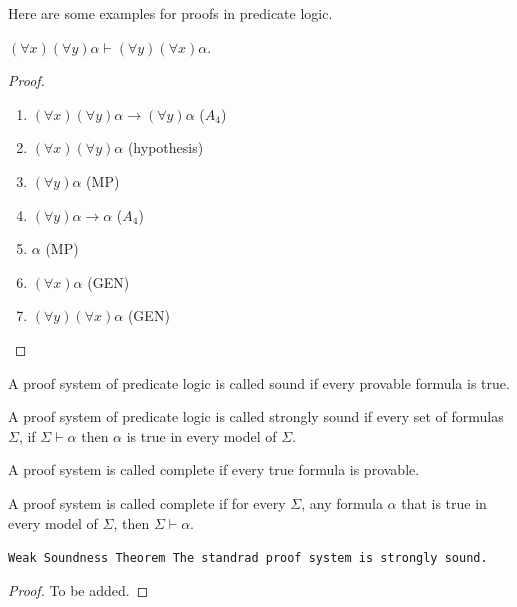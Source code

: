\documentclass[11pt,a4paper]{article}
\renewcommand{\implies}{\rightarrow}
\begin{document}
Here are some examples for proofs in predicate logic.

\begin{proposition}
  $(\forall x)(\forall y) \alpha \vdash (\forall y)(\forall x) \alpha$.
\end{proposition}
\begin{proof}
  \begin{enumerate}
    \item $(\forall x)(\forall y) \alpha \implies (\forall y) \alpha$ 
      ($A_4$)
    \item $(\forall x)(\forall y) \alpha$ (hypothesis)
    \item $(\forall y) \alpha$ (MP)
    \item $(\forall y) \alpha \implies \alpha$ ($A_4$)
    \item $\alpha$ (MP)
    \item $(\forall x) \alpha$ (GEN)
    \item $(\forall y)(\forall x) \alpha$ (GEN)
  \end{enumerate}
\end{proof}

\begin{definition}
  A proof system of predicate logic is called sound if every provable 
  formula is true.
\end{definition}

\begin{definition}
  A proof system of predicate logic is called strongly sound if every 
  set of formulas $\Sigma$, if $\Sigma \vdash \alpha$ then
  $\alpha$ is true in every model of $\Sigma$.
\end{definition}

\begin{definition}
  A proof system is called complete if every true formula is provable.
\end{definition}

\begin{definition}
  A proof system is called complete if for every $\Sigma$, any formula 
  $\alpha$ that is true in every model of $\Sigma$, then 
  $\Sigma \vdash \alpha$.
\end{definition}


\begin{theorem}\tt{Weak Soundness Theorem}
  The standrad proof system is strongly sound.
\end{theorem}
\begin{proof}
  To be added.
\end{proof}
\end{document}
